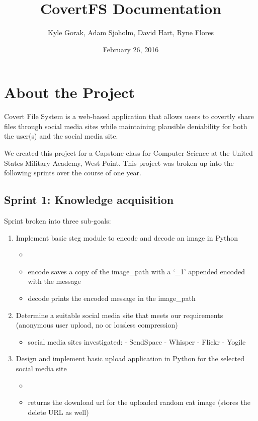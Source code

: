 \documentclass[letterpaper,10pt,english]{sphinxmanual}
\title{CovertFS Documentation}
\date{February 26, 2016}
\author{Kyle Gorak, Adam Sjoholm, David Hart, Ryne Flores}
\begin{document}
\maketitle
\tableofcontents
{}\label{index::doc}


\chapter{About the Project}
\label{index:about-the-project}
Covert File System is a web-based application that allows users to covertly share files through social media sites while maintaining plausible deniability for both the user(s) and the social media site.

We created this project for a Capstone class for Computer Science at the United States Military Academy, West Point. This project was broken up into the following sprints over the course of one year.


\section{Sprint 1: Knowledge acquisition}
\label{index:sprint-1-knowledge-acquisition}
Sprint broken into three sub-goals:
\begin{enumerate}
\item {} 
Implement basic steg module to encode and decode an image in Python
\begin{itemize}
\item {} 

\item {} 
encode saves a copy of the image\_path with a `\_1' appended encoded with the message

\item {} 
decode prints the encoded message in the image\_path

\end{itemize}

\item {} 
Determine a suitable social media site that meets our requirements (anonymous user upload, no or lossless compression)
\begin{itemize}
\item {} 
social media sites investigated:
- SendSpace
- Whisper
- Flickr
- Yogile

\end{itemize}

\item {} 
Design and implement basic upload application in Python for the selected social media site
\begin{itemize}
\item {} 

\item {} 
returns the download url for the uploaded random cat image (stores the delete URL as well)

\end{itemize}

\end{enumerate}
\end{document}
